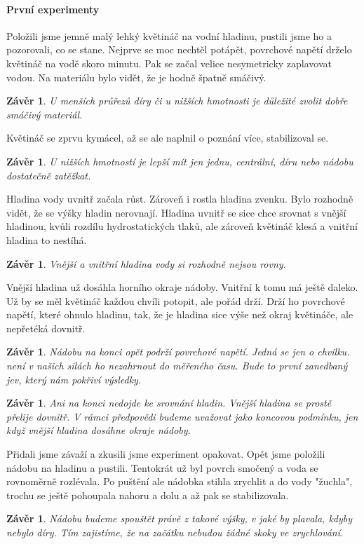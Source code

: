 \documentclass[14pt,a4paper]{article}
\newtheorem{pozorovani}[priklad]{Závěr}
\begin{document}
\paragraph{První experimenty}
Položili jsme jemně malý lehký květináč na vodní hladinu, pustili jsme ho a pozorovali, co se stane. Nejprve se moc nechtěl potápět, povrchové napětí drželo květináč na vodě skoro minutu. Pak se začal velice nesymetricky zaplavovat vodou. Na materiálu bylo vidět, že je hodně špatně smáčivý.
\begin{pozorovani}
U menších průřezů díry či u nižších hmotnosti je důležité zvolit dobře smáčivý materiál.
\end{pozorovani} 
Květináč se zprvu kymácel, až se ale naplnil o poznání více, stabilizoval se.
\begin{pozorovani}
U nižších hmotností je lepší mít jen jednu, centrální, díru nebo nádobu dostatečně zatěžkat.
\end{pozorovani} 
Hladina vody uvnitř začala růst. Zároveň i rostla hladina zvenku. Bylo rozhodně vidět, že se výšky hladin nerovnají. Hladina uvnitř se sice chce srovnat s vnější hladinou, kvůli rozdílu hydrostatických tlaků, ale zároveň květináč klesá a vnitřní hladina to nestíhá. 
\begin{pozorovani}
Vnější a vnitřní hladina vody si rozhodně nejsou rovny.
\end{pozorovani} 
Vnější hladina už dosáhla horního okraje nádoby. Vnitřní k tomu má ještě daleko. Už by se měl květináč každou chvíli potopit, ale pořád drží. Drží ho povrchové napětí, které ohnulo hladinu, tak, že je hladina sice výše než okraj květináče, ale nepřetéká dovnitř.
\begin{pozorovani}
\label{konec napeti}
Nádobu na konci opět podrží povrchové napětí. Jedná se jen o chvilku. není v našich silách ho nezahrnout do měřeného času. Bude to první zanedbaný jev, který nám pokřiví výsledky.
\end{pozorovani} 
\begin{pozorovani}
\label{konec}
Ani na konci nedojde ke srovnání hladin. Vnější hladina se prostě přelije dovnitř. V rámci předpovědi budeme uvažovat jako koncovou podmínku, jen když vnější hladina dosáhne okraje nádoby.
\end{pozorovani}
Přidali jsme závaží a zkusili jsme experiment opakovat.
Opět jsme položili nádobu na hladinu a pustili. Tentokrát už byl povrch smočený a voda se rovnoměrně rozlévala. Po puštění ale nádobka stihla zrychlit a do vody "žuchla", trochu se ještě pohoupala nahoru a dolu a až pak se stabilizovala. 
\begin{pozorovani}
\label{vyska}
Nádobu budeme spouštět právě z takové výšky, v jaké by plavala, kdyby nebylo díry. Tím zajistíme, že na začátku nebudou žádné skoky ve zrychlování.
\end{pozorovani}
\end{document}
